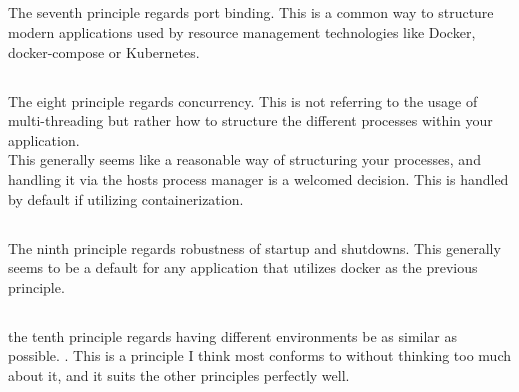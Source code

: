 \documentclass[a4paper,10pt]{article}
\begin{document}
	\subsection{}
	The seventh principle regards port binding. This is a common way to structure modern applications used by resource management technologies like Docker, docker-compose or Kubernetes. 
	
	\subsection{}
	The eight principle regards concurrency. This is not referring to the usage of multi-threading but rather how to structure the different processes within your application.
	\cite[Any computer program, once run, is represented by one or more processes. Web apps have taken a variety of process-execution forms. For example, PHP processes run as child processes of Apache, started on demand as needed by request volume. Java processes take the opposite approach, with the JVM providing one massive uberprocess that reserves a large block of system resources (CPU and memory) on startup, with concurrency managed internally via threads. In both cases, the running process(es) are only minimally visible to the developers of the app.]{documentation}\\
	This generally seems like a reasonable way of structuring your processes, and handling it via the hosts process manager is a welcomed decision. This is handled by default if utilizing containerization. \cite[With containerized services, you further get the concurrency recommended in the Twelve‑Factor App, for free.]{microservices_twelve-fator_site}
	
	\subsection{}
	The ninth principle regards robustness of startup and shutdowns. \cite{microservices_twelve-fator_site}This generally seems to be a default for any application that utilizes docker as the previous principle.
	
	\subsection{}
	the tenth principle regards having different environments be as similar as possible. 
	\cite[Developers sometimes find great appeal in using a lightweight backing service in their local environments, while a more serious and robust backing service will be used in production. For example, using SQLite locally and PostgreSQL in production; or local process memory for caching in development and Memcached in production.]{documentation}. 
	This is a principle I think most conforms to without thinking too much about it, and it suits the other principles perfectly well.
	
\end{document}
